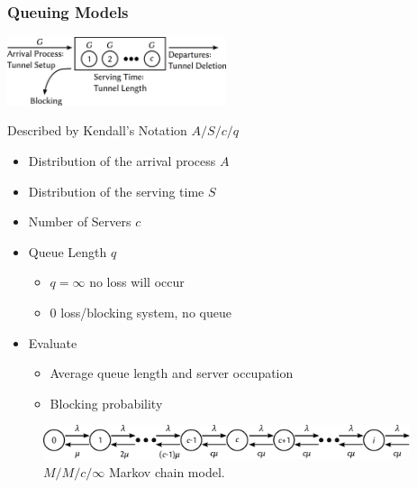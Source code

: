 \documentclass{beamer}
\begin{document}
\begin{frame}
	\frametitle{Queuing Models}
	\begin{center}
		\includegraphics[height=2cm]{extras/GGn-model.png}
	\end{center}

	Described by Kendall's Notation $A/S/c/q$
	\begin{itemize}
	\item Distribution of the arrival process $A$
	\item Distribution of the serving time $S$
	\item Number of Servers $c$
	\item Queue Length $q$
	\begin{itemize}
		\item $q=\infty$ no loss will occur
		\item $0$ loss/blocking system, no queue
	\end{itemize}
	\item Evaluate
		\begin{itemize}
			\item Average queue length and server occupation
			\item Blocking probability
		\end{itemize}
	\end{itemize}
\end{frame}

\begin{frame}
	\begin{figure}
		\includegraphics[height=1cm]{extras/markovchain.png}
		\caption{$M/M/c/\infty$ Markov chain model.}
	\end{figure}
\end{frame}
\end{document}
